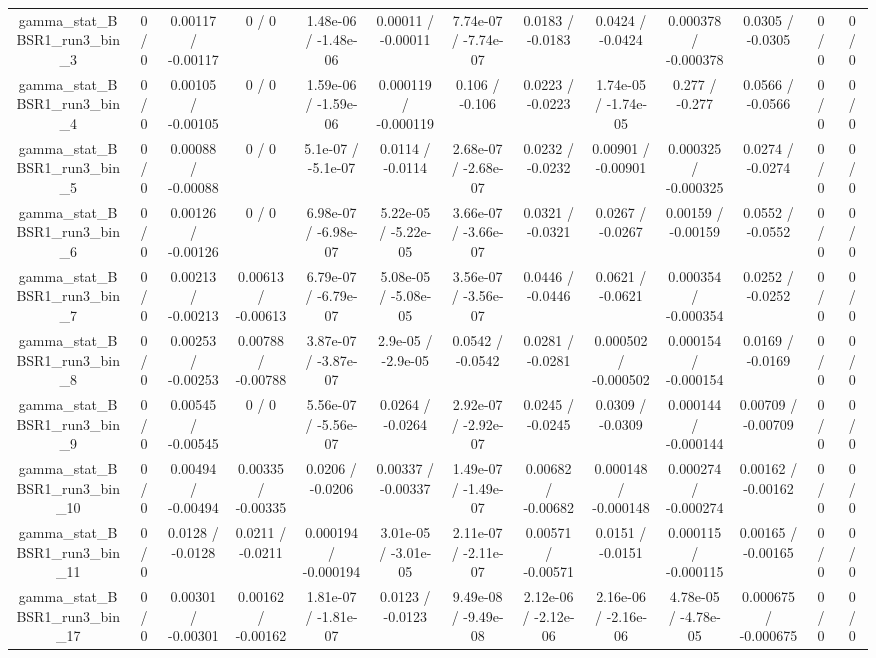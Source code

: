 \documentclass[10pt]{article}
\begin{document}
\begin{table}[htbp]
\begin{center}
\begin{tabular}{|c|c|c|c|c|c|c|c|c|c|c|c|c|}
  gamma_stat_BBSR1_run3_bin_3 & 0 / 0 & 0.00117 / -0.00117 & 0 / 0 & 1.48e-06 / -1.48e-06 & 0.00011 / -0.00011 & 7.74e-07 / -7.74e-07 & 0.0183 / -0.0183 & 0.0424 / -0.0424 & 0.000378 / -0.000378 & 0.0305 / -0.0305 & 0 / 0 & 0 / 0 \\ 
  gamma_stat_BBSR1_run3_bin_4 & 0 / 0 & 0.00105 / -0.00105 & 0 / 0 & 1.59e-06 / -1.59e-06 & 0.000119 / -0.000119 & 0.106 / -0.106 & 0.0223 / -0.0223 & 1.74e-05 / -1.74e-05 & 0.277 / -0.277 & 0.0566 / -0.0566 & 0 / 0 & 0 / 0 \\ 
  gamma_stat_BBSR1_run3_bin_5 & 0 / 0 & 0.00088 / -0.00088 & 0 / 0 & 5.1e-07 / -5.1e-07 & 0.0114 / -0.0114 & 2.68e-07 / -2.68e-07 & 0.0232 / -0.0232 & 0.00901 / -0.00901 & 0.000325 / -0.000325 & 0.0274 / -0.0274 & 0 / 0 & 0 / 0 \\ 
  gamma_stat_BBSR1_run3_bin_6 & 0 / 0 & 0.00126 / -0.00126 & 0 / 0 & 6.98e-07 / -6.98e-07 & 5.22e-05 / -5.22e-05 & 3.66e-07 / -3.66e-07 & 0.0321 / -0.0321 & 0.0267 / -0.0267 & 0.00159 / -0.00159 & 0.0552 / -0.0552 & 0 / 0 & 0 / 0 \\ 
  gamma_stat_BBSR1_run3_bin_7 & 0 / 0 & 0.00213 / -0.00213 & 0.00613 / -0.00613 & 6.79e-07 / -6.79e-07 & 5.08e-05 / -5.08e-05 & 3.56e-07 / -3.56e-07 & 0.0446 / -0.0446 & 0.0621 / -0.0621 & 0.000354 / -0.000354 & 0.0252 / -0.0252 & 0 / 0 & 0 / 0 \\ 
  gamma_stat_BBSR1_run3_bin_8 & 0 / 0 & 0.00253 / -0.00253 & 0.00788 / -0.00788 & 3.87e-07 / -3.87e-07 & 2.9e-05 / -2.9e-05 & 0.0542 / -0.0542 & 0.0281 / -0.0281 & 0.000502 / -0.000502 & 0.000154 / -0.000154 & 0.0169 / -0.0169 & 0 / 0 & 0 / 0 \\ 
  gamma_stat_BBSR1_run3_bin_9 & 0 / 0 & 0.00545 / -0.00545 & 0 / 0 & 5.56e-07 / -5.56e-07 & 0.0264 / -0.0264 & 2.92e-07 / -2.92e-07 & 0.0245 / -0.0245 & 0.0309 / -0.0309 & 0.000144 / -0.000144 & 0.00709 / -0.00709 & 0 / 0 & 0 / 0 \\ 
  gamma_stat_BBSR1_run3_bin_10 & 0 / 0 & 0.00494 / -0.00494 & 0.00335 / -0.00335 & 0.0206 / -0.0206 & 0.00337 / -0.00337 & 1.49e-07 / -1.49e-07 & 0.00682 / -0.00682 & 0.000148 / -0.000148 & 0.000274 / -0.000274 & 0.00162 / -0.00162 & 0 / 0 & 0 / 0 \\ 
  gamma_stat_BBSR1_run3_bin_11 & 0 / 0 & 0.0128 / -0.0128 & 0.0211 / -0.0211 & 0.000194 / -0.000194 & 3.01e-05 / -3.01e-05 & 2.11e-07 / -2.11e-07 & 0.00571 / -0.00571 & 0.0151 / -0.0151 & 0.000115 / -0.000115 & 0.00165 / -0.00165 & 0 / 0 & 0 / 0 \\ 
  gamma_stat_BBSR1_run3_bin_17 & 0 / 0 & 0.00301 / -0.00301 & 0.00162 / -0.00162 & 1.81e-07 / -1.81e-07 & 0.0123 / -0.0123 & 9.49e-08 / -9.49e-08 & 2.12e-06 / -2.12e-06 & 2.16e-06 / -2.16e-06 & 4.78e-05 / -4.78e-05 & 0.000675 / -0.000675 & 0 / 0 & 0 / 0 \\ 

\end{tabular}
\end{center}
\end{table}
\end{document}
